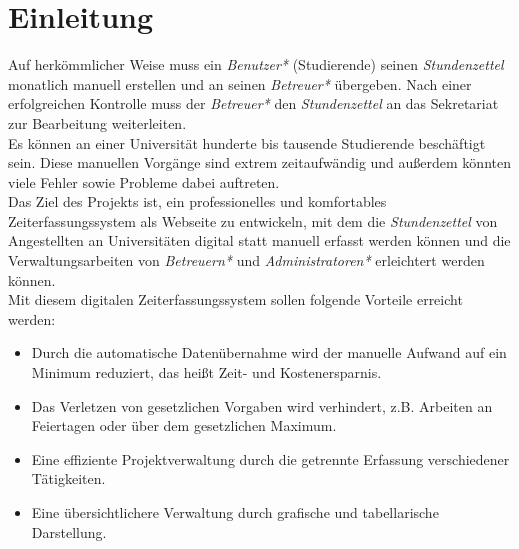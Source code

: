 \section{Einleitung}

Auf herkömmlicher Weise muss ein \emph{Benutzer*} (Studierende) seinen \emph{Stundenzettel} monatlich manuell erstellen und an seinen \emph{Betreuer*} übergeben. Nach einer erfolgreichen Kontrolle muss der \emph{Betreuer*} den \emph{Stundenzettel} an das Sekretariat zur Bearbeitung weiterleiten. \\

Es können an einer Universität hunderte bis tausende Studierende beschäftigt sein. Diese manuellen Vorgänge sind extrem zeitaufwändig und außerdem könnten viele Fehler sowie Probleme dabei auftreten.\\

Das Ziel des Projekts ist, ein professionelles und komfortables Zeiterfassungssystem als Webseite zu entwickeln, mit dem die \emph{Stundenzettel} von Angestellten an Universitäten digital statt manuell erfasst werden können und die Verwaltungsarbeiten von \emph{Betreuern*} und \emph{Administratoren*} erleichtert werden können.\\

Mit diesem digitalen Zeiterfassungssystem sollen folgende Vorteile erreicht werden:

\begin{itemize}
	\item Durch die automatische Datenübernahme wird der manuelle Aufwand auf ein Minimum reduziert, das heißt Zeit- und Kostenersparnis.
	\item Das Verletzen von gesetzlichen Vorgaben wird verhindert, z.B. Arbeiten an Feiertagen oder über dem gesetzlichen Maximum.
	\item Eine effiziente Projektverwaltung durch die getrennte Erfassung verschiedener Tätigkeiten.
	\item Eine übersichtlichere Verwaltung durch grafische und tabellarische Darstellung.
\end{itemize}
